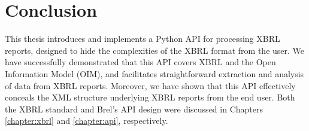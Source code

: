 \chapter{Conclusion}
\label{chapter:conclusion}


This thesis introduces and implements a Python API for processing XBRL reports, designed to hide the complexities of the XBRL format from the user.
We have successfully demonstrated that this API covers XBRL and the Open Information Model (OIM),
and facilitates straightforward extraction and analysis of data from XBRL reports.
Moreover, we have shown that this API effectively conceals the XML structure underlying XBRL reports from the end user.
Both the XBRL standard and Brel's API design were discussed in Chapters \ref{chapter:xbrl} and \ref{chapter:api}, respectively.


